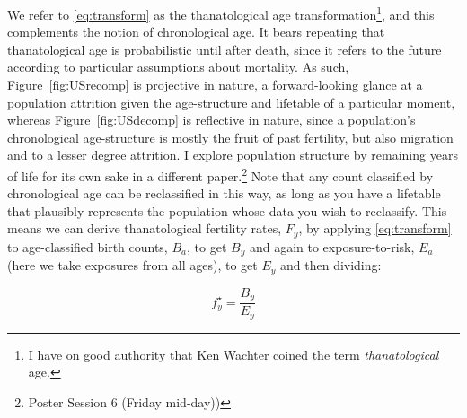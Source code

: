 \documentclass{article}
\begin{document}
We refer to \eqref{eq:transform} as the thanatological age
transformation\footnote{I have on good authority that Ken Wachter
coined the term \textit{thanatological} age.}, and this complements the notion
of chronological age. It bears repeating that thanatological age is
probabilistic until after death, since it refers to the future according to
particular assumptions about mortality. As such, Figure~\ref{fig:USrecomp} is
projective in nature, a forward-looking glance at a population attrition given the age-structure and
lifetable of a particular moment, whereas Figure~\ref{fig:USdecomp} is reflective in nature, since a population's
chronological age-structure is mostly the fruit of past fertility, but also
migration and to a lesser degree attrition. I explore population structure by remaining years of life
for its own sake in a different paper.\footnote{Poster Session 6 (Friday
mid-day))} Note that any count classified by chronological age can be
reclassified in this way, as long as you have a lifetable that plausibly represents the population whose data you wish to reclassify. This means we can derive thanatological fertility rates, $F_y$, by applying \eqref{eq:transform}
to age-classified birth counts, $B_a$, to get $B_y$ and again to
exposure-to-risk, $E_a$ (here we take exposures from all ages), to get $E_y$ and then dividing:

\begin{equation}
f^\star_y = \frac{B_y}{E_y}
\end{equation}
\end{document}
